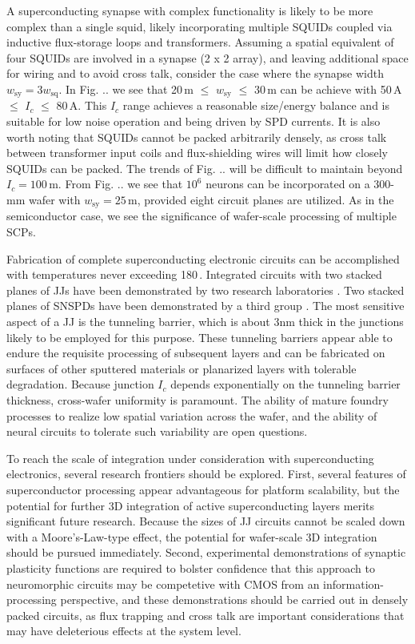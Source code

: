 \documentclass[twocolumn]{article}
\begin{document}
A superconducting synapse with complex functionality is likely to be more complex than a single squid, likely incorporating multiple SQUIDs coupled via inductive flux-storage loops and transformers. Assuming a spatial equivalent of four SQUIDs are involved in a synapse (2 x 2 array), and leaving additional space for wiring and to avoid cross talk, consider the case where the synapse width $w_{\mathrm{sy}} = 3w_{\mathrm{sq}}$. In Fig. .. we see that 20\,\textmu m $\le$ $w_{\mathrm{sy}}$ $\le$ 30\,\textmu m can be achieve with 50\,\textmu A $\le$ $I_c$ $\le$ 80\,\textmu A. This $I_c$ range achieves a reasonable size/energy balance and is suitable for low noise operation and being driven by SPD currents. It is also worth noting that SQUIDs cannot be packed arbitrarily densely, as cross talk between transformer input coils and flux-shielding wires will limit how closely SQUIDs can be packed. The trends of Fig. .. will be difficult to maintain beyond $I_c = 100$\,\textmu m. From Fig. .. we see that $10^6$ neurons can be incorporated on a 300-mm wafer with $w_{\mathrm{sy}} = 25$\,\textmu m, provided eight circuit planes are utilized. As in the semiconductor case, we see the significance of wafer-scale processing of multiple SCPs.

Fabrication of complete superconducting electronic circuits can be accomplished with temperatures never exceeding 180\,\textcelsius. Integrated circuits with two stacked planes of JJs have been demonstrated by two research laboratories \cite{}. Two stacked planes of SNSPDs have been demonstrated by a third group \cite{}. The most sensitive aspect of a JJ is the tunneling barrier, which is about 3nm thick in the junctions likely to be employed for this purpose. These tunneling barriers appear able to endure the requisite processing of subsequent layers and can be fabricated on surfaces of other sputtered materials or planarized layers with tolerable degradation. Because junction $I_c$ depends exponentially on the tunneling barrier thickness, cross-wafer uniformity is paramount. The ability of mature foundry processes to realize low spatial variation across the wafer, and the ability of neural circuits to tolerate such variability are open questions.

To reach the scale of integration under consideration with superconducting electronics, several research frontiers should be explored. First, several features of superconductor processing appear advantageous for platform scalability, but the potential for further 3D integration of active superconducting layers merits significant future research. Because the sizes of JJ circuits cannot be scaled down with a Moore's-Law-type effect, the potential for wafer-scale 3D integration should be pursued immediately. Second, experimental demonstrations of synaptic plasticity functions are required to bolster confidence that this approach to neuromorphic circuits may be competetive with CMOS from an information-processing perspective, and these demonstrations should be carried out in densely packed circuits, as flux trapping and cross talk are important considerations that may have deleterious effects at the system level. 
\end{document}
